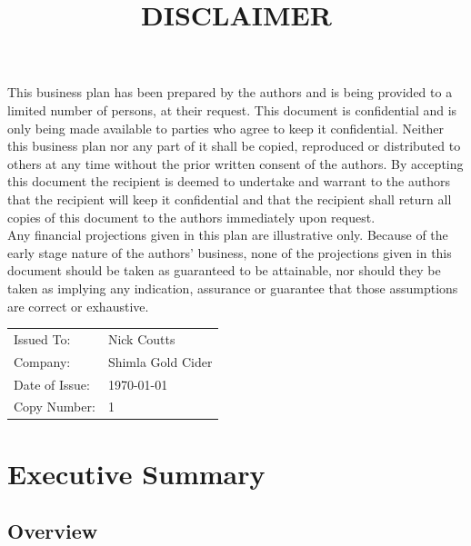 \documentclass[11pt]{article}
\begin{document}
\title{DISCLAIMER}
\maketitle

\noindent This business plan has been prepared by the authors and is being provided to a limited number of persons, at their request. This document is confidential and is only being made available to parties who agree to keep it confidential. Neither this business plan nor any part of it shall be copied, reproduced or distributed to others at any time without the prior written consent of the authors. By accepting this document the recipient is deemed to undertake and warrant to the authors that the recipient will keep it confidential and that the recipient shall return all copies of this document to the authors immediately upon request. \\

\noindent Any financial projections given in this plan are illustrative only. Because of the early stage nature of the authors’ business, none of the projections given in this document should be taken as guaranteed to be attainable, nor should they be taken as implying any indication, assurance or guarantee that those assumptions are correct or exhaustive.
\vfill
\begin{table}[H]
\begin{center}
\begin{tabular}{| l l |}
\hline
Issued To:      &  Nick Coutts        \\
Company:        &  Shimla Gold Cider  \\
Date of Issue:  &  \today             \\
Copy Number:    &  1                  \\
\hline
\end{tabular}
\end{center}
\end{table}

\newpage
\tableofcontents

\newpage

\section{Executive Summary}
  \subsection{Overview}
\end{document}

